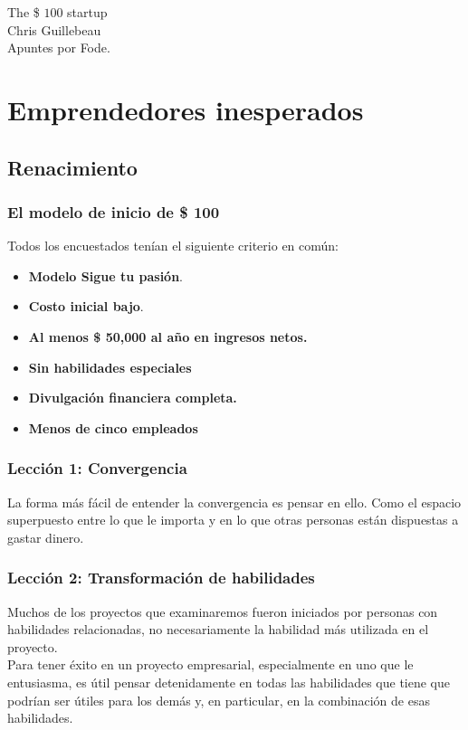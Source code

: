 \documentclass[10pt]{book}
\begin{document}
\begin{center}
\huge The \$ $100$ startup\\
\vspace*{0.5cm}
\large Chris Guillebeau\\
\vspace{1cm}
\Large Apuntes por Fode.
\vspace{1.5cm}
\end{center}


\part{Emprendedores inesperados}
    \chapter{Renacimiento}
	\section{El modelo de inicio de \$ 100}	
	Todos los encuestados tenían el siguiente criterio en común:
	\begin{itemize}
	    \item \textbf{Modelo Sigue tu pasión}. 
	    \item \textbf{Costo inicial bajo}. 
	    \item \textbf{Al menos \$ 50,000 al año en ingresos netos.}
	    \item \textbf{Sin habilidades especiales}
	    \item \textbf{Divulgación financiera completa.}
	    \item \textbf{Menos de cinco empleados}
	\end{itemize}

	\section{Lección 1: Convergencia}        
	La forma más fácil de entender la convergencia es pensar en ello. Como el espacio superpuesto entre lo que le importa y en lo que otras personas están dispuestas a gastar dinero.	

	\section{Lección 2: Transformación de habilidades}
	Muchos de los proyectos que examinaremos fueron iniciados por personas con habilidades relacionadas, no necesariamente la habilidad más utilizada en el proyecto.\\
	Para tener éxito en un proyecto empresarial, especialmente en uno que le entusiasma, es útil pensar detenidamente en todas las habilidades que tiene que podrían ser útiles para los demás y, en particular, en la combinación de esas habilidades.
\end{document}
